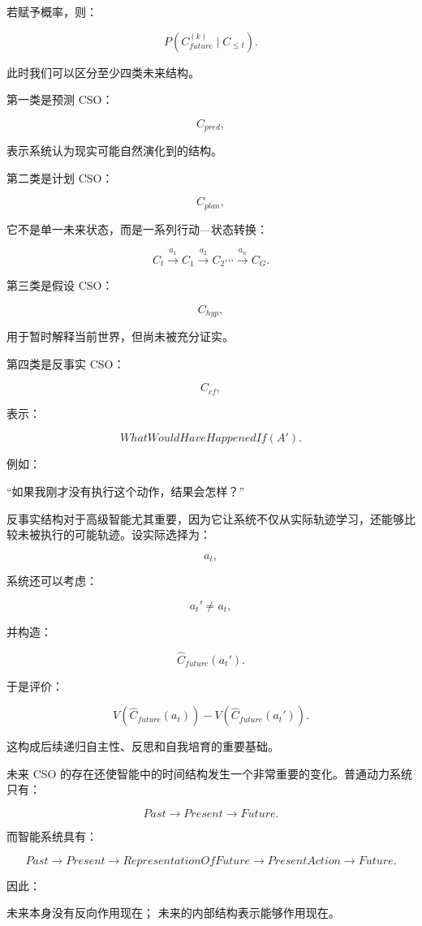若赋予概率，则：

\[
P
\left(
C_{future}^{(k)}
\mid
C_{\leq t}
\right).
\]

此时我们可以区分至少四类未来结构。

第一类是预测 CSO：

\[
C_{pred},
\]

表示系统认为现实可能自然演化到的结构。

第二类是计划 CSO：

\[
C_{plan},
\]

它不是单一未来状态，而是一系列行动—状态转换：

\[
C_t
\xrightarrow{a_1}
C_1
\xrightarrow{a_2}
C_2
\cdots
\xrightarrow{a_n}
C_G.
\]

第三类是假设 CSO：

\[
C_{hyp},
\]

用于暂时解释当前世界，但尚未被充分证实。

第四类是反事实 CSO：

\[
C_{cf},
\]

表示：

\[
WhatWouldHaveHappenedIf
(
A'
).
\]

例如：

“如果我刚才没有执行这个动作，结果会怎样？”

反事实结构对于高级智能尤其重要，因为它让系统不仅从实际轨迹学习，还能够比较未被执行的可能轨迹。设实际选择为：

\[
a_t,
\]

系统还可以考虑：

\[
a_t'\neq a_t,
\]

并构造：

\[
\hat C_{future}(a_t').
\]

于是评价：

\[
V
\left(
\hat C_{future}(a_t)
\right)
-
V
\left(
\hat C_{future}(a_t')
\right).
\]

这构成后续递归自主性、反思和自我培育的重要基础。

未来 CSO 的存在还使智能中的时间结构发生一个非常重要的变化。普通动力系统只有：

\[
Past
\rightarrow
Present
\rightarrow
Future.
\]

而智能系统具有：

\[
Past
\rightarrow
Present
\rightarrow
RepresentationOfFuture
\rightarrow
PresentAction
\rightarrow
Future.
\]

因此：

\begin{statementbox}
未来本身没有反向作用现在；
未来的内部结构表示能够作用现在。
\end{statementbox}

